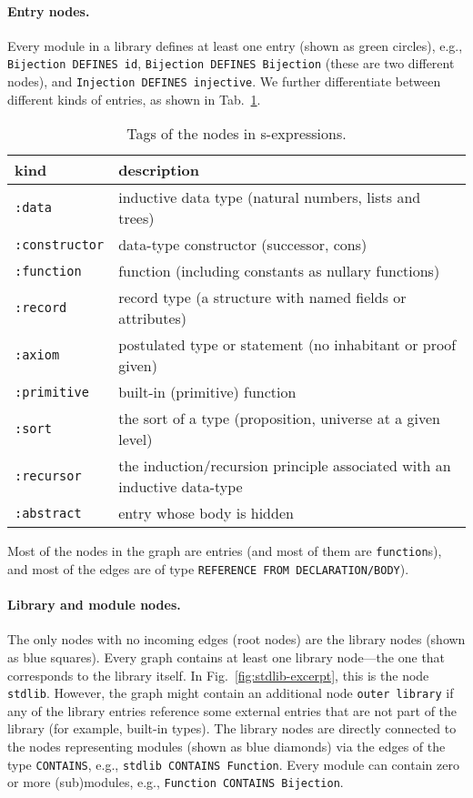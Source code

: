 \documentclass{article}
\begin{document}
\paragraph{Entry nodes.} Every module in a library defines at least one entry (shown as green circles), e.g., \texttt{Bijection DEFINES id}, \texttt{Bijection DEFINES Bijection} (these are two different nodes), and \texttt{Injection DEFINES injective}. We further differentiate between different kinds of entries, as shown in Tab.~\ref{tab:entry-kinds}.
\begin{table}[!htb]
    \centering
    \caption{Tags of the nodes in s-expressions.}
    \label{tab:entry-kinds}
    \begin{tabular}{l | p{10cm}}
			kind & description \\
			\hline
			\texttt{:data} & inductive data type (natural numbers, lists and trees)\\
			\texttt{:constructor} & data-type constructor (successor, cons)\\
			\texttt{:function} & function (including constants as nullary functions) \\
			\texttt{:record} & record type (a structure with named fields or attributes)\\
			\texttt{:axiom} & postulated type or statement (no inhabitant or proof given) \\
			\texttt{:primitive} & built-in (primitive) function \\
			\texttt{:sort} & the sort of a type (proposition, universe at a given level) \\
            \texttt{:recursor} & the induction/recursion principle associated with an inductive data-type \\
            \texttt{:abstract} & entry whose body is hidden
		\end{tabular}
\end{table}
Most of the nodes in the graph are entries (and most of them are \texttt{function}s), and most of the edges are of type \texttt{REFERENCE FROM DECLARATION/BODY}). 

\paragraph{Library and module nodes.} The only nodes with no incoming edges (root nodes) are the library nodes (shown as blue squares). Every graph contains at least one library node---the one that corresponds to the library itself. In Fig.~\ref{fig:stdlib-excerpt}, this is the node \texttt{stdlib}. However, the graph might contain an additional node \texttt{outer library} if any of the library entries reference some external entries that are not part of the library (for example, built-in types). The library nodes are directly connected to the nodes representing modules (shown as blue diamonds) via the edges of the type \texttt{CONTAINS}, e.g., \texttt{stdlib CONTAINS Function}. Every module can contain zero or more (sub)modules, e.g., \texttt{Function CONTAINS Bijection}.
\end{document}
